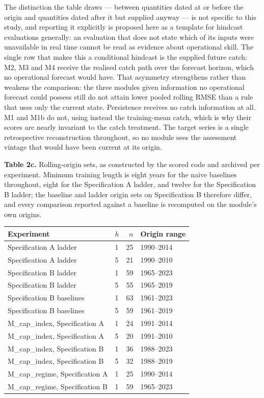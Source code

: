\documentclass[11pt]{article}
\begin{document}
The distinction the table draws --- between quantities dated at or
before the origin and quantities dated after it but supplied anyway ---
is not specific to this study, and reporting it explicitly is proposed
here as a template for hindcast evaluations generally: an evaluation
that does not state which of its inputs were unavailable in real time
cannot be read as evidence about operational skill. The single row that
makes this a conditional hindcast is the supplied future catch: M2, M3 and M4 receive the realised catch path over the
forecast horizon, which no operational forecast would have. That asymmetry
strengthens rather than weakens the comparison: the three modules given
information no operational forecast could possess still do not attain
lower pooled rolling RMSE than a rule that uses only the current state.
Persistence receives no catch information at all. M1 and M1b
do not, using instead the training-mean catch, which is why their scores
are nearly invariant to the catch treatment. The target series is a
single retrospective reconstruction throughout, so no module sees the
assessment vintage that would have been current at its origin.

\textbf{Table 2c.} Rolling-origin sets, as constructed by the scored
code and archived per experiment. Minimum training length is eight years
for the naive baselines throughout, eight for the Specification A
ladder, and twelve for the Specification B ladder; the baseline and
ladder origin sets on Specification B therefore differ, and every
comparison reported against a baseline is recomputed on the module's own
origins.

\begin{longtable}[]{@{}llrl@{}}
\toprule\noalign{}
Experiment & \(h\) & \(n\) & Origin range \\
\midrule\noalign{}
\endhead
\bottomrule\noalign{}
\endlastfoot
Specification A ladder & 1 & 25 & 1990--2014 \\
Specification A ladder & 5 & 21 & 1990--2010 \\
Specification B ladder & 1 & 59 & 1965--2023 \\
Specification B ladder & 5 & 55 & 1965--2019 \\
Specification B baselines & 1 & 63 & 1961--2023 \\
Specification B baselines & 5 & 59 & 1961--2019 \\
M\_cap\_index, Specification A & 1 & 24 & 1991--2014 \\
M\_cap\_index, Specification A & 5 & 20 & 1991--2010 \\
M\_cap\_index, Specification B & 1 & 36 & 1988--2023 \\
M\_cap\_index, Specification B & 5 & 32 & 1988--2019 \\
M\_cap\_regime, Specification A & 1 & 25 & 1990--2014 \\
M\_cap\_regime, Specification B & 1 & 59 & 1965--2023 \\
\end{longtable}
\end{document}
